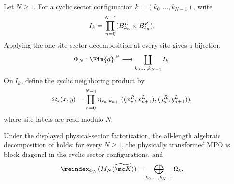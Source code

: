 \begin{definition}
    \label{def:mpdo_physical_sector_chain_coordinates}
    \leanok
    Let $N\geq1$. For a cyclic sector configuration
    $k=(k_0,\ldots,k_{N-1})$, write
    \begin{align}
        I_k
         & =\prod_{n=0}^{N-1}(B_{k_n}^L\times B_{k_n}^R).
        \notag
    \end{align}
    Applying the one-site sector decomposition at every site gives a
    bijection
    \begin{align}
        \Phi_N:\Fin{d}^{\,N}
         & \longrightarrow
        \coprod_{k_0,\ldots,k_{N-1}}I_k.
        \notag
    \end{align}
    On $I_k$, define the cyclic neighboring product by
    \begin{align}
        \Omega_k(x,y)
         & =\prod_{n=0}^{N-1}
        \eta_{k_n,k_{n+1}}
        ((x_n^R,x_{n+1}^L),(y_n^R,y_{n+1}^L)),
        \notag
    \end{align}
    where site labels are read modulo $N$.
\end{definition}

\begin{lemma}
    \label{thm:mpdo_physical_sector_chain_decomposition}
    \leanok
    Under the displayed physical-sector factorization, the all-length
    algebraic decomposition of
    \cite[Appendix~C.2, lines~1435--1450]{Cirac2016MPDO_arXiv} holds: for every
    $N\geq1$, the physically transformed MPO is block diagonal in the cyclic
    sector configurations, and
    \begin{align}
        \reindex_{\Phi_N}(M_N(\widetilde{\mc K}))
         & =\bigoplus_{k_0,\ldots,k_{N-1}}\Omega_k.
        \notag
    \end{align}
\end{lemma}

